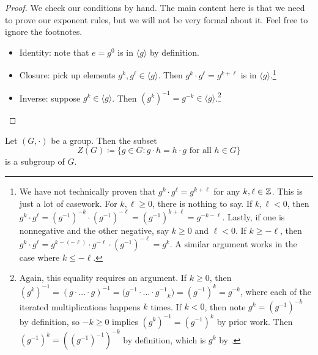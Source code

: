 \documentclass[../notes.tex]{subfiles}
\begin{document}
\begin{proof}
    We check our conditions by hand. The main content here is that we need to prove our exponent rules, but we will not be very formal about it. Feel free to ignore the footnotes.
    \begin{itemize}
        \item Identity: note that $e=g^0$ is in $\langle g\rangle$ by definition.
        \item Closure: pick up elements $g^k,g^\ell\in\langle g\rangle$. Then $g^k\cdot g^\ell=g^{k+\ell}$ is in $\langle g\rangle$.\footnote{We have not technically proven that $g^k\cdot g^\ell=g^{k+\ell}$ for any $k,\ell\in\mathbb Z$. This is just a lot of casework. For $k,\ell\ge0$, there is nothing to say. If $k,\ell<0$, then $g^k\cdot g^\ell=\left(g^{-1}\right)^{-k}\cdot\left(g^{-1}\right)^{-\ell}=\left(g^{-1}\right)^{k+\ell}=g^{-k-\ell}$. Lastly, if one is nonnegative and the other negative, say $k\ge0$ and $\ell<0$. If $k\ge-\ell$, then $g^k\cdot g^\ell=g^{k-(-\ell)}\cdot g^{-\ell}\cdot\left(g^{-1}\right)^{-\ell}=g^{k}$. A similar argument works in the case where $k\le-\ell$.}
        \item Inverse: suppose $g^k\in\langle g\rangle$. Then $\left(g^k\right)^{-1}=g^{-k}\in\langle g\rangle$.\footnote{Again, this equality requires an argument. If $k\ge0$, then $\left(g^k\right)^{-1}=({g\cdot\ldots\cdot g})^{-1}=\big({g^{-1}\cdot\ldots\cdot g^{-1}}_k\big)=\left(g^{-1}\right)^k=g^{-k}$, where each of the iterated multiplications happens $k$ times. If $k<0$, then note $g^k=\left(g^{-1}\right)^{-k}$ by definition, so $-k\ge0$ implies $\left(g^k\right)^{-1}=\left(g^{-1}\right)^k$ by prior work. Then $\left(g^{-1}\right)^k=\left(\left(g^{-1}\right)^{-1}\right)^{-k}$ by definition, which is $g^k$ by .}
        \qedhere
    \end{itemize}
\end{proof}
\begin{proposition} \label{prop:center}
    Let $(G,\cdot)$ be a group. Then the subset
    \[Z(G)\coloneqq\{g\in G:g\cdot h=h\cdot g\text{ for all }h\in G\}\]
    is a subgroup of $G$.
\end{proposition}
\end{document}
